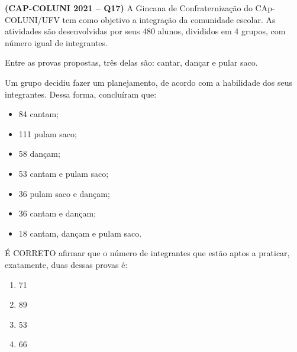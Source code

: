 \textbf{(CAP-COLUNI 2021 -- Q17)} A Gincana de Confraternização do CAp-COLUNI/UFV tem como objetivo a integração da comunidade escolar. As atividades são desenvolvidas por seus 480 alunos, divididos em 4 grupos, com número igual de integrantes.

Entre as provas propostas, três delas são: cantar, dançar e pular saco.

Um grupo decidiu fazer um planejamento, de acordo com a habilidade dos seus integrantes. Dessa forma, concluíram que:
\begin{itemize}
\item 84 cantam;
\item 111 pulam saco;
\item 58 dançam;
\item 53 cantam e pulam saco;
\item 36 pulam saco e dançam;
\item 36 cantam e dançam;
\item 18 cantam, dançam e pulam saco.
\end{itemize}

É CORRETO afirmar que o número de integrantes que estão aptos a praticar, exatamente, duas dessas provas é:

\begin{enumerate}
	\item 71
	\item 89
	\item 53
	\item 66
\end{enumerate}
